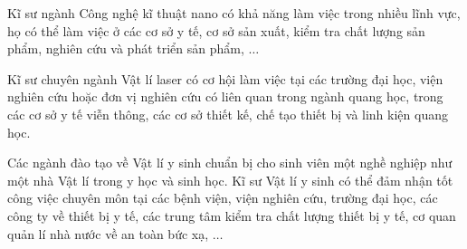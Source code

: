 Kĩ sư ngành Công nghệ kĩ thuật nano có khả năng làm việc trong nhiều lĩnh vực, họ có thể làm việc ở các cơ sở y tế, cơ sở sản xuất, kiểm tra chất lượng sản phẩm, nghiên cứu và phát triển sản phẩm, $\ldots$

Kĩ sư chuyên ngành Vật lí laser có cơ hội làm việc tại các trường đại học, viện nghiên cứu hoặc đơn vị nghiên cứu có liên quan trong ngành quang học, trong các cơ sở y tế viễn thông, các cơ sở thiết kế, chế tạo thiết bị và linh kiện quang học.

Các ngành đào tạo về Vật lí y sinh chuẩn bị cho sinh viên một nghề nghiệp như một nhà Vật lí trong y học và sinh học. Kĩ sư Vật lí y sinh có thể đảm nhận tốt công việc chuyên môn tại các bệnh viện, viện nghiên cứu, trường đại học, các công ty về thiết bị y tế, các trung tâm kiểm tra chất lượng thiết bị y tế, cơ quan quản lí nhà nước về an toàn bức xạ, $\ldots$
